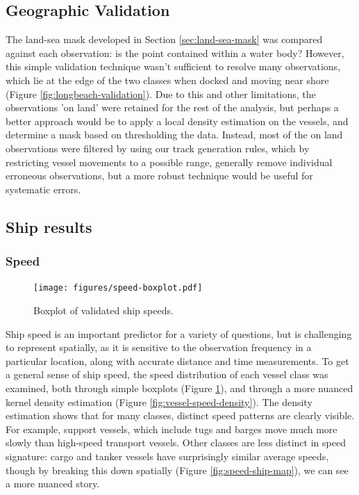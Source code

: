 \subsection{Geographic Validation}

The land-sea mask developed in Section \ref{sec:land-sea-mask}  was compared against each observation: is the point contained within a water body? However, this simple validation technique wasn't sufficient to resolve many observations, which lie at the edge of the two classes when docked and moving near shore (Figure \ref{fig:longbeach-validation}). Due to this and other limitations, the observations 'on land' were retained for the rest of the analysis, but perhaps a better approach would be to apply a local density estimation on the vessels, and determine a mask based on thresholding the data. Instead, most of the on land observations were filtered by using our track generation rules, which by restricting vessel movements to a possible range, generally remove individual erroneous observations, but a more robust technique would be useful for systematic errors.


\subsection{Ship results}

\subsubsection{Speed}
\begin{figure}[htbp]
  \centering
  \texttt{[image: figures/speed-boxplot.pdf]}
  \caption{Boxplot of validated ship speeds.}
  \label{fig:vessel-speed-boxplot}
\end{figure}

Ship speed is an important predictor for a variety of questions, but is challenging to represent spatially, as it is sensitive to the observation frequency in a particular location, along with accurate distance and time measurements. To get a general sense of ship speed, the speed distribution of each vessel class was examined, both through simple boxplots (Figure \ref{fig:vessel-speed-boxplot}), and through a more nuanced kernel density estimation (Figure \ref{fig:vessel-speed-density}). The density estimation shows that for many classes, distinct speed patterns are clearly visible. For example, support vessels, which include tugs and barges move much more slowly than high-speed transport vessels. Other classes are less distinct in speed signature: cargo and tanker vessels have surprisingly similar average speeds, though by breaking this down spatially (Figure \ref{fig:speed-ship-map}), we can see a more nuanced story.

